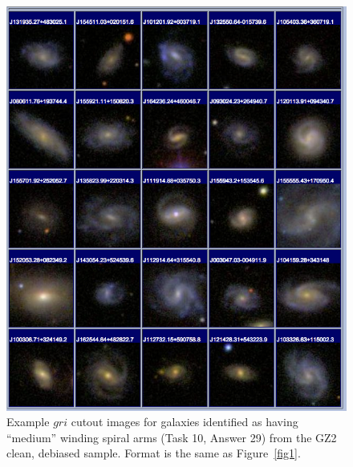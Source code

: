 \documentclass[useAMS,usenatbib]{mn2e}
\begin{document}
\newpage
\clearpage
\begin{figure}
\includegraphics[angle=0,width=7.0in]{figures/gallery/medium.png}
\caption{Example $gri$ cutout images for galaxies identified as having ``medium'' winding spiral arms (Task 10, Answer 29) from the GZ2 clean, debiased sample. Format is the same as Figure~\ref{fig1}.}
\end{figure}
\end{document}

